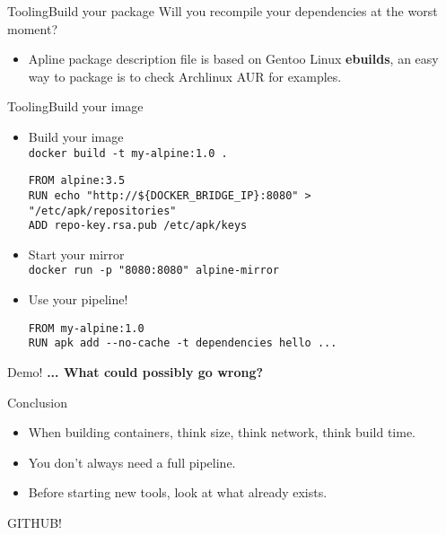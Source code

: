 \documentclass{beamer}
\begin{document}
\begin{frame}[fragile]{Tooling}{Build your package}
  Will you recompile your dependencies at the worst moment?
  \\
  \begin{itemize}

    \item Apline package description file is based on Gentoo Linux \textbf{ebuilds},
      an easy way to package is to check Archlinux AUR for examples.
  \end{itemize}
\end{frame}

\begin{frame}[fragile]{Tooling}{Build your image}
  \begin{itemize}
    \item Build your image \\ \texttt{docker build -t my-alpine:1.0 .}
      \begin{verbatim}
FROM alpine:3.5
RUN echo "http://${DOCKER_BRIDGE_IP}:8080" > "/etc/apk/repositories"
ADD repo-key.rsa.pub /etc/apk/keys
      \end{verbatim}
    \item Start your mirror \\
      \texttt{docker run -p "8080:8080" alpine-mirror}
    \item Use your pipeline!
      \begin{verbatim}
FROM my-alpine:1.0
RUN apk add --no-cache -t dependencies hello ...
      \end{verbatim}

  \end{itemize}

\end{frame}

\begin{frame}{Demo!}
  \LARGE \textbf{... What could possibly go wrong?}
\end{frame}

\begin{frame}{Conclusion}

  \begin{itemize}
    \item When building containers, think size, think network, think build time.
    \item You don't always need a full pipeline.
    \item Before starting new tools, look at what already exists.
  \end{itemize}

GITHUB!
\end{frame}
\end{document}

